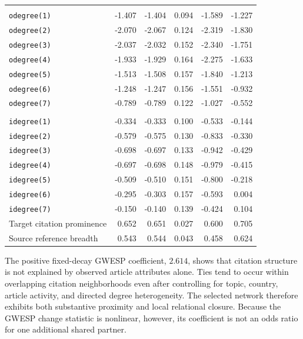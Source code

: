 \documentclass[preprint,12pt,authoryear]{elsarticle}
\begin{document}
\begin{table}[H]
{\begin{tabular}{lrrrrr}
\addlinespace
\multicolumn{6}{l}{\textit{Out-degree controls}} \\
\texttt{odegree(1)} & -1.407 & -1.404 & 0.094 & -1.589 & -1.227 \\
\texttt{odegree(2)} & -2.070 & -2.067 & 0.124 & -2.319 & -1.830 \\
\texttt{odegree(3)} & -2.037 & -2.032 & 0.152 & -2.340 & -1.751 \\
\texttt{odegree(4)} & -1.933 & -1.929 & 0.164 & -2.275 & -1.633 \\
\texttt{odegree(5)} & -1.513 & -1.508 & 0.157 & -1.840 & -1.213 \\
\texttt{odegree(6)} & -1.248 & -1.247 & 0.156 & -1.551 & -0.932 \\
\texttt{odegree(7)} & -0.789 & -0.789 & 0.122 & -1.027 & -0.552 \\
\addlinespace
\multicolumn{6}{l}{\textit{In-degree controls}} \\
\texttt{idegree(1)} & -0.334 & -0.333 & 0.100 & -0.533 & -0.144 \\
\texttt{idegree(2)} & -0.579 & -0.575 & 0.130 & -0.833 & -0.330 \\
\texttt{idegree(3)} & -0.698 & -0.697 & 0.133 & -0.942 & -0.429 \\
\texttt{idegree(4)} & -0.697 & -0.698 & 0.148 & -0.979 & -0.415 \\
\texttt{idegree(5)} & -0.509 & -0.510 & 0.151 & -0.800 & -0.218 \\
\texttt{idegree(6)} & -0.295 & -0.303 & 0.157 & -0.593 & 0.004 \\
\texttt{idegree(7)} & -0.150 & -0.140 & 0.139 & -0.424 & 0.104 \\
\addlinespace
Target citation prominence & 0.652 & 0.651 & 0.027 & 0.600 & 0.705 \\
Source reference breadth & 0.543 & 0.544 & 0.043 & 0.458 & 0.624 \\
\bottomrule
\end{tabular}%
}
\end{table}


The positive fixed-decay GWESP coefficient, \(2.614\), shows that citation
structure is not explained by observed article attributes alone. Ties tend to
occur within overlapping citation neighborhoods even after controlling for
topic, country, article activity, and directed degree heterogeneity. The
selected network therefore exhibits both substantive proximity and local
relational closure. Because the GWESP change statistic is nonlinear, however,
its coefficient is not an odds ratio for one additional shared partner.
\end{document}
